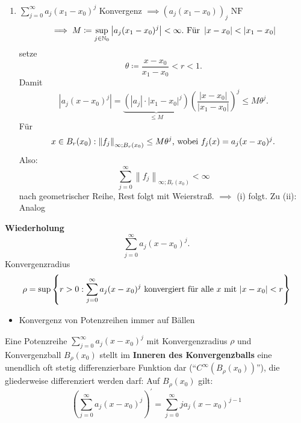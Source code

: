 \begin{subproof*}
	\begin{enumerate}[label=(\roman*)]
		\item $ \sum_{j=0}^{\infty} a_j (x_1 - x_0)^j $ Konvergenz $ \implies \left( a_j (x_1 - x_0) \right) _j \text{ NF} $
			\[
				\implies M \coloneqq \sup_{j \in \mathbb{N} _0} \left| a_j (x_1 - x_0)^j \right| < \infty. \text{ Für } \left| x - x_0 \right| < \left| x_1 - x_0 \right|
			\]
			setze
			\[
				\theta \coloneqq \frac{ x - x_0 }{ x_1 - x_0 } < r < 1.
			\]
			Damit
			\[
				\left| a_j (x - x_0)^j \right| = \underbrace{\left( \left| a_j \right| \cdot \left| x_1 - x_0 \right| ^j \right) }_{\leq M} \left( \frac{ \left| x - x_0 \right| }{ \left| x_1 - x_0 \right| } \right)^j \leq  M \theta^j.
			\]
			Für
			\[
				x \in B_{r}(x_0) : \left\| f_j \right\| _{\infty; B_{r}(x_0) } \leq M \theta^j $, wobei $ f_j(x) = a_j(x - x_0)^j.
			\]
			Also:
			\[
				\sum_{j=0}^{\infty} \left\| f_j \right\| _{\infty; B_{r}(x_0) } < \infty
			\]
			nach geometrischer Reihe, Rest folgt mit Weierstraß. $ \implies  $ (i) folgt. Zu (ii): Analog
	\end{enumerate}
\end{subproof*}

\textbf{Wiederholung}
\[
	\sum_{j=0}^{\infty} a_j(x - x_0)^j.
\]
Konvergenzradius
\[
	\rho = \sup \left\{ r > 0 : \sum_{j=0}^{\infty} a_j(x - x_0)^j \text{ konvergiert für alle $ x $ mit $ \left| x - x_0 \right| < r $}  \right\} 
\]
\begin{itemize}
	\item Konvergenz von Potenzreihen immer auf Bällen
\end{itemize}

\begin{subcorollary}
	Eine Potenzreihe $ \sum_{j=0}^{\infty} a_j (x-x_0)^j  $ mit Konvergenzradius $ \rho $ und Konvergenzball $ B_{\rho}(x_0)  $ stellt im \textbf{Inneren des Konvergenzballs} eine unendlich oft stetig differenzierbare Funktion dar (``$ C^\infty \left( B_{\rho}(x_0)  \right)  $''), die gliederweise differenziert werden darf: Auf $ B_{\rho}(x_0)  $ gilt:
	\[
		\left( \sum_{j=0}^{\infty} a_j (x - x_0)^j  \right) ^\prime = \sum_{j=0}^{\infty} ja_j (x - x_0)^{j-1}  
	\]
	
\end{subcorollary}

